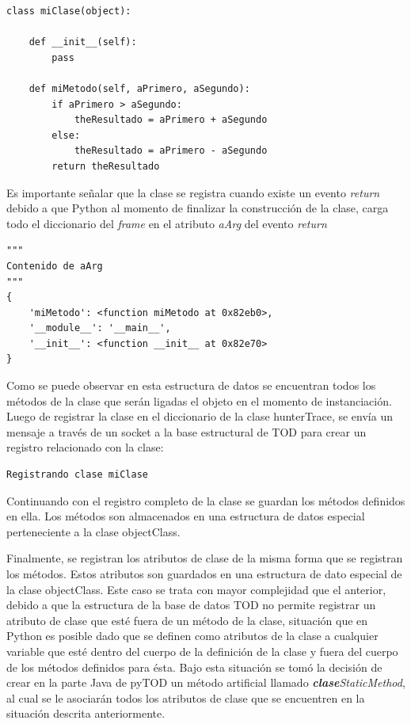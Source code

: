 \documentclass[12pt,legalpaper]{report}
\begin{document}
\begin{singlespace}
\begin{lstlisting}[style=Python]
class miClase(object):

    def __init__(self):
        pass
    
    def miMetodo(self, aPrimero, aSegundo):
        if aPrimero > aSegundo:
            theResultado = aPrimero + aSegundo
        else:
            theResultado = aPrimero - aSegundo
        return theResultado
\end{lstlisting}
\end{singlespace}

Es importante señalar que la clase se registra cuando existe un evento \textit{return} debido a que Python al momento de finalizar la construcción de la clase, carga todo el diccionario del \textit{frame} en el atributo \textit{aArg} del evento \textit{return} \cite{bytecode} 

\begin{singlespace}
\begin{lstlisting}[style=consola,numbers=none]
"""
Contenido de aArg
"""
{
	'miMetodo': <function miMetodo at 0x82eb0>, 
	'__module__': '__main__',
	'__init__': <function __init__ at 0x82e70>
}

\end{lstlisting}
\end{singlespace}

Como se puede observar en esta estructura de datos se encuentran todos los métodos de la clase que serán ligadas el objeto en el momento de instanciación.  Luego de registrar la clase en el diccionario de la clase hunterTrace, se envía un mensaje a través de un socket a la base estructural de TOD para crear un registro relacionado con la clase:

\begin{singlespace}
\begin{lstlisting}[style=consola,numbers=none]
Registrando clase miClase
\end{lstlisting}
\end{singlespace}

Continuando con el registro completo de la clase se guardan los métodos definidos en ella.  Los métodos son almacenados en una estructura de datos especial perteneciente a la clase objectClass.

Finalmente, se registran los atributos de clase de la misma forma que se registran los métodos.  Estos atributos son guardados en una estructura de dato especial de la clase objectClass.  Este caso se trata con mayor complejidad que el anterior, debido a que la estructura de la base de datos TOD no permite registrar un atributo de clase que esté fuera de un método de la clase, situación que en Python es posible dado que se definen como atributos de la clase a cualquier variable que esté dentro del cuerpo de la definición de la clase y fuera del cuerpo de los métodos definidos para ésta.  Bajo esta situación se tomó la decisión de crear en la parte Java de pyTOD un método artificial llamado \textit{\textbf{clase}StaticMethod}, al cual se le asociarán todos los atributos de clase que se encuentren en la situación descrita anteriormente.
\end{document}
